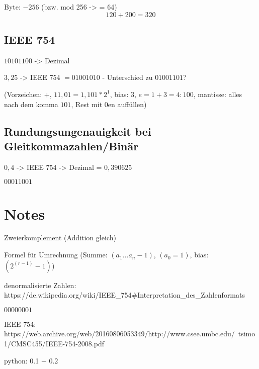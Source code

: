 \documentclass{article}
\begin{document}
Byte: $-256$ (bzw. mod 256 -> = 64)
$$120 + 200 = 320$$

\subsection{IEEE 754}
$10101100$ -> Dezimal

$3,25$ -> IEEE 754 $= 01001010$ - Unterschied zu $01001101$?

(Vorzeichen: $+$, $11,01 = 1,101 * 2^1$, bias: $3$, $e = 1+3 = 4: 100$, mantisse: alles nach dem komma $101$, Rest mit $0$en auffüllen)

\subsection{Rundungsungenauigkeit bei Gleitkommazahlen/Binär}
$0,4$ -> IEEE 754 -> Dezimal = $0,390625$

$00011001$

\section{Notes}
Zweierkomplement (Addition gleich)

Formel für Umrechnung (Summe: $(a_1...a_n-1)$, $(a_0=1)$, bias: $(2^(r-1)-1)$)

denormalisierte Zahlen: https://de.wikipedia.org/wiki/IEEE\_754\#Interpretation\_des\_Zahlenformats

$00000001$

IEEE 754: https://web.archive.org/web/20160806053349/http://www.csee.umbc.edu/~tsimo1/CMSC455/IEEE-754-2008.pdf

python: 0.1 + 0.2
\end{document}
